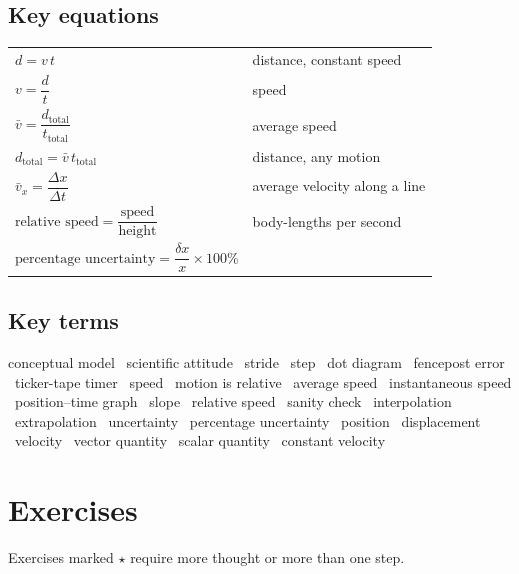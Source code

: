 \documentclass[11pt,twoside,openany]{book}
\newcounter{check}[chapter]
\begin{document}
\subsection*{Key equations}
\begin{center}
\renewcommand{\arraystretch}{1.6}
\begin{tabular}{ll}
\toprule
$d = v\,t$ & distance, constant speed \\
$v = \dfrac{d}{t}$ & speed \\
$\bar v = \dfrac{d_{\text{total}}}{t_{\text{total}}}$ & average speed \\
$d_{\text{total}} = \bar v\,t_{\text{total}}$ & distance, any motion \\
$\bar v_x = \dfrac{\Delta x}{\Delta t}$ & average velocity along a line \\
$\text{relative speed} = \dfrac{\text{speed}}{\text{height}}$ & body-lengths per second \\
$\text{percentage uncertainty} = \dfrac{\delta x}{x}\times 100\%$ & \\
\bottomrule
\end{tabular}
\end{center}

\subsection*{Key terms}
conceptual model \textperiodcentered\ scientific attitude \textperiodcentered\ stride \textperiodcentered\ step \textperiodcentered\ dot diagram \textperiodcentered\ fencepost error \textperiodcentered\ ticker-tape timer \textperiodcentered\ speed \textperiodcentered\ motion is relative \textperiodcentered\ average speed \textperiodcentered\ instantaneous speed \textperiodcentered\ position--time graph \textperiodcentered\ slope \textperiodcentered\ relative speed \textperiodcentered\ sanity check \textperiodcentered\ interpolation \textperiodcentered\ extrapolation \textperiodcentered\ uncertainty \textperiodcentered\ percentage uncertainty \textperiodcentered\ position \textperiodcentered\ displacement \textperiodcentered\ velocity \textperiodcentered\ vector quantity \textperiodcentered\ scalar quantity \textperiodcentered\ constant velocity

\section{Exercises}

Exercises marked $\star$ require more thought or more than one step.
\end{document}
